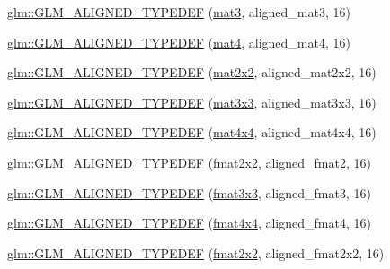 \begin{DoxyCompactItemize}
\item 
\mbox{\hyperlink{group__gtx__type__aligned_ga17f911ee7b78ca6d1b91c4ab51ddb73c}{glm\+::\+G\+L\+M\+\_\+\+A\+L\+I\+G\+N\+E\+D\+\_\+\+T\+Y\+P\+E\+D\+EF}} (\mbox{\hyperlink{group__core__types_gadfaff2a7dce5cbf4e77a47ecea42ac5b}{mat3}}, aligned\+\_\+mat3, 16)
\item 
\mbox{\hyperlink{group__gtx__type__aligned_ga31940e6012b72110e26fdb0f54805033}{glm\+::\+G\+L\+M\+\_\+\+A\+L\+I\+G\+N\+E\+D\+\_\+\+T\+Y\+P\+E\+D\+EF}} (\mbox{\hyperlink{group__core__types_ga7dcd2365c2e368e6af5b7adeb6a9c8df}{mat4}}, aligned\+\_\+mat4, 16)
\item 
\mbox{\hyperlink{group__gtx__type__aligned_ga01de96cd0b541c52d2b4a3faf65822e9}{glm\+::\+G\+L\+M\+\_\+\+A\+L\+I\+G\+N\+E\+D\+\_\+\+T\+Y\+P\+E\+D\+EF}} (\mbox{\hyperlink{group__core__types_gaeddc14adb4963d9bad73866cc202fb40}{mat2x2}}, aligned\+\_\+mat2x2, 16)
\item 
\mbox{\hyperlink{group__gtx__type__aligned_gac88a191b004bd341e64fc53b5a4d00e3}{glm\+::\+G\+L\+M\+\_\+\+A\+L\+I\+G\+N\+E\+D\+\_\+\+T\+Y\+P\+E\+D\+EF}} (\mbox{\hyperlink{group__core__types_ga6fecca6a869070b6bf8acb44ce1c2af3}{mat3x3}}, aligned\+\_\+mat3x3, 16)
\item 
\mbox{\hyperlink{group__gtx__type__aligned_gabe8c745fa2ced44a600a6e3f19991161}{glm\+::\+G\+L\+M\+\_\+\+A\+L\+I\+G\+N\+E\+D\+\_\+\+T\+Y\+P\+E\+D\+EF}} (\mbox{\hyperlink{group__core__types_ga63e3ee9447ed593484140a9368e738ec}{mat4x4}}, aligned\+\_\+mat4x4, 16)
\item 
\mbox{\hyperlink{group__gtx__type__aligned_ga719da577361541a4c43a2dd1d0e361e1}{glm\+::\+G\+L\+M\+\_\+\+A\+L\+I\+G\+N\+E\+D\+\_\+\+T\+Y\+P\+E\+D\+EF}} (\mbox{\hyperlink{group__gtc__type__precision_gad3b3ab6399b8b960e8994b37521bab86}{fmat2x2}}, aligned\+\_\+fmat2, 16)
\item 
\mbox{\hyperlink{group__gtx__type__aligned_ga6e7ee4f541e1d7db66cd1a224caacafb}{glm\+::\+G\+L\+M\+\_\+\+A\+L\+I\+G\+N\+E\+D\+\_\+\+T\+Y\+P\+E\+D\+EF}} (\mbox{\hyperlink{group__gtc__type__precision_ga5bf6f06e3cac1ed82489f858a0816aaa}{fmat3x3}}, aligned\+\_\+fmat3, 16)
\item 
\mbox{\hyperlink{group__gtx__type__aligned_gae5d672d359f2a39f63f98c7975057486}{glm\+::\+G\+L\+M\+\_\+\+A\+L\+I\+G\+N\+E\+D\+\_\+\+T\+Y\+P\+E\+D\+EF}} (\mbox{\hyperlink{group__gtc__type__precision_gaeda4baa9a8e3113ff879dd5e7bdf5334}{fmat4x4}}, aligned\+\_\+fmat4, 16)
\item 
\mbox{\hyperlink{group__gtx__type__aligned_ga6fa2df037dbfc5fe8c8e0b4db8a34953}{glm\+::\+G\+L\+M\+\_\+\+A\+L\+I\+G\+N\+E\+D\+\_\+\+T\+Y\+P\+E\+D\+EF}} (\mbox{\hyperlink{group__gtc__type__precision_gad3b3ab6399b8b960e8994b37521bab86}{fmat2x2}}, aligned\+\_\+fmat2x2, 16)

\end{DoxyCompactItemize}
